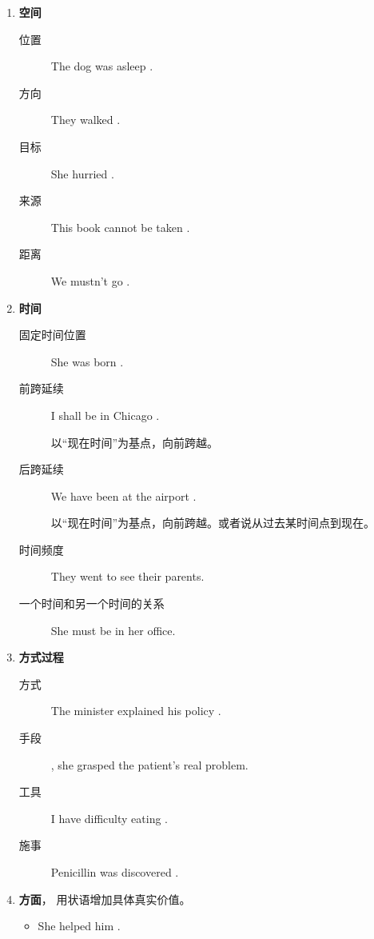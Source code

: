\begin{enumerate}
\item \textbf{空间}

  \begin{description}
  \item[位置] The dog was asleep .
  \item[方向] They walked .
  \item[目标] She hurried .
  \item[来源] This book cannot be taken .
  \item[距离] We mustn't go .
  \end{description}
\item \textbf{时间}

  \begin{description}
  \item[固定时间位置] She was born .
  \item[前跨延续] I shall be in Chicago .

    以“现在时间”为基点，向前跨越。
  \item[后跨延续] We have been at the airport .

    以“现在时间”为基点，向前跨越。或者说从过去某时间点到现在。

  \item[时间频度] They  went to see their parents.
  \item [一个时间和另一个时间的关系] She must  be in her office.
  \end{description}

\item \textbf{方式过程}

  \begin{description}
  \item[方式] The minister explained his policy .
  \item[手段] , she grasped the patient's real problem.
  \item[工具] I have difficulty eating .
  \item[施事] Penicillin was discovered .
  \end{description}

\item \textbf{方面}， 用状语增加具体真实价值。
  \begin{itemize}
  \item She helped him .


\end{itemize}
\end{enumerate}
